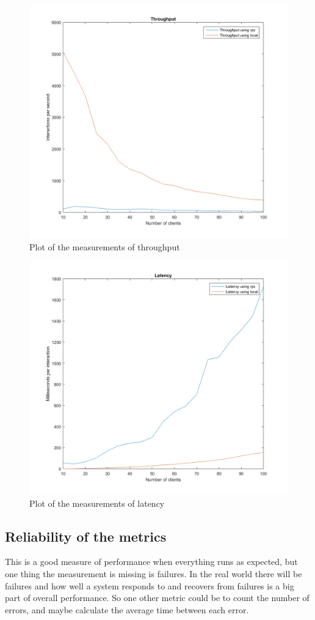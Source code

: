 \documentclass{article}
\theoremstyle{plain}
\theoremstyle{nonumberplain}
\begin{document}
\centering
\begin{figure}
	\hspace*{-2.2in}
	\includegraphics[scale=0.85]{throughput}
	\caption{Plot of the measurements of throughput}
\end{figure}
\begin{figure}
	\hspace*{-2.2in}
	\includegraphics[scale=0.85]{latency}
	\caption{Plot of the measurements of latency}
\end{figure}

\subsection{Reliability of the metrics}
This is a good measure of performance when everything runs as expected, but one thing the measurement is missing is failures. In the real world there will be failures and how well a system responds to and recovers from failures is a big part of overall performance. So one other metric could be to count the number of errors, and maybe calculate the average time between each error.
\end{document}

